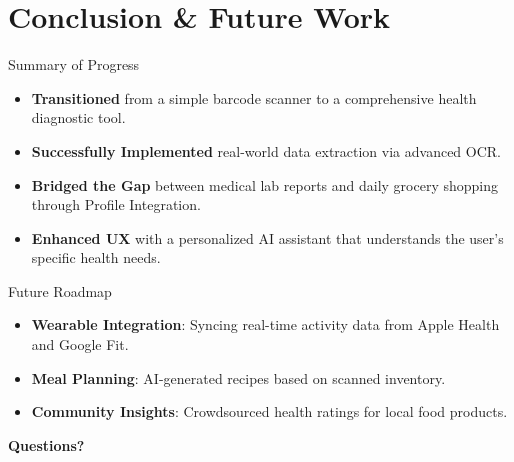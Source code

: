 \section{Conclusion \& Future Work}

\begin{frame}{Summary of Progress}
    \begin{itemize}
        \item \textbf{Transitioned} from a simple barcode scanner to a comprehensive health diagnostic tool.
        \item \textbf{Successfully Implemented} real-world data extraction via advanced OCR.
        \item \textbf{Bridged the Gap} between medical lab reports and daily grocery shopping through Profile Integration.
        \item \textbf{Enhanced UX} with a personalized AI assistant that understands the user's specific health needs.
    \end{itemize}
\end{frame}

\begin{frame}{Future Roadmap}
    \begin{itemize}
        \item \textbf{Wearable Integration}: Syncing real-time activity data from Apple Health and Google Fit.
        \item \textbf{Meal Planning}: AI-generated recipes based on scanned inventory.
        \item \textbf{Community Insights}: Crowdsourced health ratings for local food products.
    \end{itemize}
    \vspace{1cm}
    \centering
    \Large \textbf{Questions?}
\end{frame}
